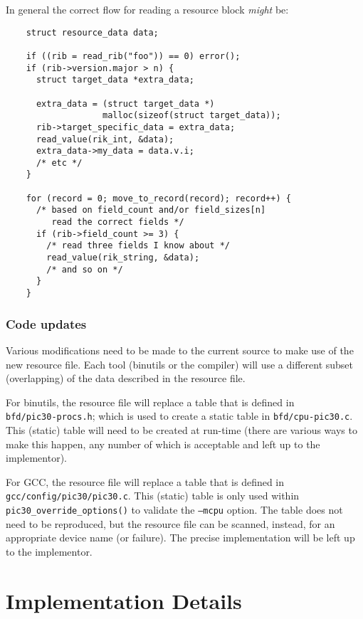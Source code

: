 \documentclass{article}
\begin{document}
  In general the correct flow for reading a resource block \textit{might} be:
  \begin{verbatim}
    struct resource_data data;

    if ((rib = read_rib("foo")) == 0) error();
    if (rib->version.major > n) {
      struct target_data *extra_data;

      extra_data = (struct target_data *)
                   malloc(sizeof(struct target_data));
      rib->target_specific_data = extra_data;
      read_value(rik_int, &data);
      extra_data->my_data = data.v.i;
      /* etc */
    }
    
    for (record = 0; move_to_record(record); record++) {
      /* based on field_count and/or field_sizes[n] 
         read the correct fields */
      if (rib->field_count >= 3) {
        /* read three fields I know about */
        read_value(rik_string, &data);
        /* and so on */
      }
    }
  \end{verbatim}

  \subsubsection{Code updates}

  Various modifications need to be made to the current source to make use
  of the new resource file.  Each tool (binutils or the compiler) will use
  a different subset (overlapping) of the data described in the resource file.

  For binutils, the resource file will replace a table that is defined in \\
  \texttt{bfd/pic30-procs.h}; which is used to create a static table in
  \texttt{bfd/cpu-pic30.c}.  This (static) table will need to be created at 
  run-time (there are various ways to make this happen, any number of which is
  acceptable and left up to the implementor).

  For GCC, the resource file will replace a table that is defined in \\
  \texttt{gcc/config/pic30/pic30.c}.  This (static) table is only used within \\
  \texttt{pic30\_override\_options()} to validate the \texttt{--mcpu} option.
  The table does not need to be reproduced, but the resource file can be
  scanned, instead, for an appropriate device name (or failure).  The
  precise implementation will be left up to the implementor.

\section{Implementation Details}
\end{document}

